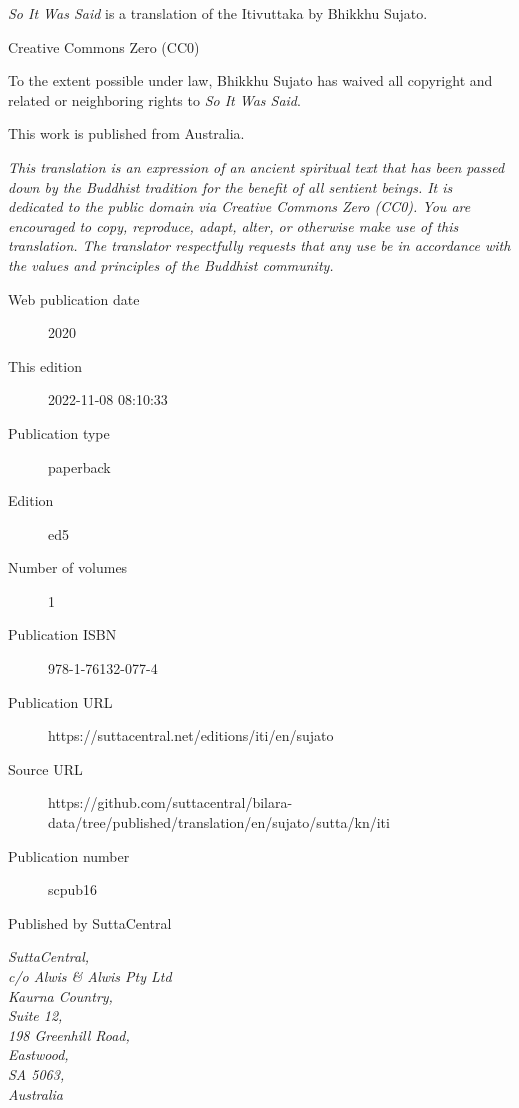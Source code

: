 \documentclass[12pt,openany]{book}%
\begin{document}
\begin{footnotesize}

\textit{So It Was Said} is a translation of the Itivuttaka by Bhikkhu Sujato.

\medskip

Creative Commons Zero (CC0)

To the extent possible under law, Bhikkhu Sujato has waived all copyright and related or neighboring rights to \textit{So It Was Said}.

\medskip

This work is published from Australia.

\begin{center}
\textit{This translation is an expression of an ancient spiritual text that has been passed down by the Buddhist tradition for the benefit of all sentient beings. It is dedicated to the public domain via Creative Commons Zero (CC0). You are encouraged to copy, reproduce, adapt, alter, or otherwise make use of this translation. The translator respectfully requests that any use be in accordance with the values and principles of the Buddhist community.}
\end{center}

\medskip

\begin{description}
    \item[Web publication date] 2020
    \item[This edition] 2022-11-08 08:10:33
    \item[Publication type] paperback
    \item[Edition] ed5
    \item[Number of volumes] 1
    \item[Publication ISBN] 978-1-76132-077-4
    \item[Publication URL] https://suttacentral.net/editions/iti/en/sujato
    \item[Source URL] https://github.com/suttacentral/bilara-data/tree/published/translation/en/sujato/sutta/kn/iti
    \item[Publication number] scpub16
\end{description}

\medskip

Published by SuttaCentral

\medskip

\textit{SuttaCentral,\\
c/o Alwis \& Alwis Pty Ltd\\
Kaurna Country,\\
Suite 12,\\
198 Greenhill Road,\\
Eastwood,\\
SA 5063,\\
Australia}

\end{footnotesize}
\end{document}
